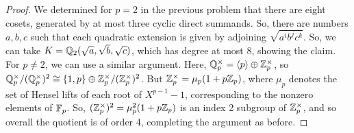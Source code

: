 \begin{proof}
	We determined for $p=2$ in the previous problem that there are eight cosets, generated by at most three cyclic direct summands. So, there are numbers $a,b,c$ such that each quadratic extension is given by adjoining $\sqrt{a^ib^jc^k}$. So, we can take $K = \mathbb{Q}_2(\sqrt{a},\sqrt{b},\sqrt{c})$, which has degree at most 8, showing the claim. For $p \neq 2$, we can use a similar argument. Here, $\mathbb{Q}_p^\times = \left<p\right> \oplus \mathbb{Z}_p^\times$, so $\mathbb{Q}_p^\times/(\mathbb{Q}_p^\times)^2 \cong \{1,p\} \oplus \mathbb{Z}_p^\times/(\mathbb{Z}_p^\times)^2$. But $\mathbb{Z}_p^\times = \mu_p(1+p\mathbb{Z}_p)$, where $\mu_p$ denotes the set of Hensel lifts of each root of $X^{p-1}-1$, corresponding to the nonzero elements of $\mathbb{F}_p$. So, $(\mathbb{Z}_p^\times)^2 = \mu_p^2(1+p\mathbb{Z}_p)$ is an index 2 subgroup of $\mathbb{Z}_p^\times$, and so overall the quotient is of order 4, completing the argument as before.
\end{proof}
